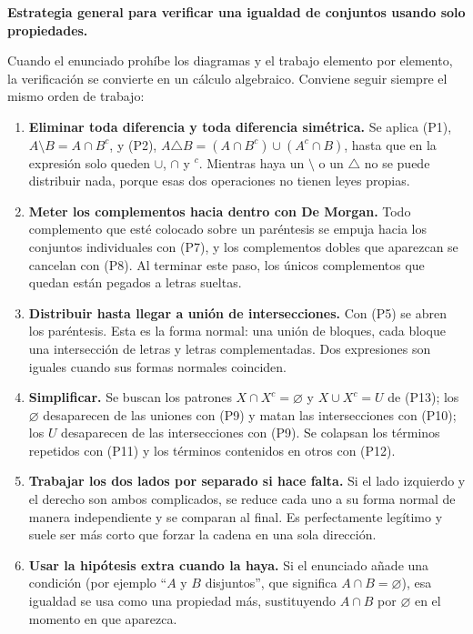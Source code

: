 \documentclass[11pt]{article}
\begin{document}
\begin{tip}
\textbf{Estrategia general para verificar una igualdad de conjuntos usando solo propiedades.}

Cuando el enunciado prohíbe los diagramas y el trabajo elemento por elemento, la verificación se
convierte en un cálculo algebraico. Conviene seguir siempre el mismo orden de trabajo:

\begin{enumerate}[leftmargin=*]
  \item \textbf{Eliminar toda diferencia y toda diferencia simétrica.} Se aplica (P1),
  $A\setminus B=A\cap B^{c}$, y (P2), $A\triangle B=(A\cap B^{c})\cup(A^{c}\cap B)$, hasta que
  en la expresión solo queden $\cup$, $\cap$ y $^{c}$. Mientras haya un $\setminus$ o un
  $\triangle$ no se puede distribuir nada, porque esas dos operaciones no tienen leyes propias.
  \item \textbf{Meter los complementos hacia dentro con De Morgan.} Todo complemento que esté
  colocado sobre un paréntesis se empuja hacia los conjuntos individuales con (P7), y los
  complementos dobles que aparezcan se cancelan con (P8). Al terminar este paso, los únicos
  complementos que quedan están pegados a letras sueltas.
  \item \textbf{Distribuir hasta llegar a unión de intersecciones.} Con (P5) se abren los
  paréntesis. Esta es la forma normal: una unión de bloques, cada bloque una intersección de
  letras y letras complementadas. Dos expresiones son iguales cuando sus formas normales
  coinciden.
  \item \textbf{Simplificar.} Se buscan los patrones $X\cap X^{c}=\varnothing$ y $X\cup X^{c}=U$
  de (P13); los $\varnothing$ desaparecen de las uniones con (P9) y matan las intersecciones con
  (P10); los $U$ desaparecen de las intersecciones con (P9). Se colapsan los términos repetidos
  con (P11) y los términos contenidos en otros con (P12).
  \item \textbf{Trabajar los dos lados por separado si hace falta.} Si el lado izquierdo y el
  derecho son ambos complicados, se reduce cada uno a su forma normal de manera independiente y
  se comparan al final. Es perfectamente legítimo y suele ser más corto que forzar la cadena en
  una sola dirección.
  \item \textbf{Usar la hipótesis extra cuando la haya.} Si el enunciado añade una condición
  (por ejemplo ``$A$ y $B$ disjuntos'', que significa $A\cap B=\varnothing$), esa igualdad se
  usa como una propiedad más, sustituyendo $A\cap B$ por $\varnothing$ en el momento en que
  aparezca.
\end{enumerate}
\end{tip}
\end{document}
